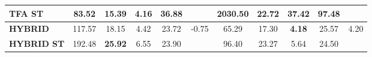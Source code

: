 \documentclass[ecp,tc, english]{iiufrgs}
\begin{document}
\begin{table}[!htbp]
{\begin{tabular}{lcccccccccc}
\textbf{TFA ST}                   & 83.52            & 15.39          & 4.16           & 36.88          &                                  & \textbf{2030.50} & 22.72          & \textbf{37.42} & \textbf{97.48} &                                  \\ \hline
\textbf{HYBRID}                   & 117.57           & 18.15          & 4.42           & 23.72          & \multirow{2}{*}{-0.75}           & 65.29            & 17.30          & \textbf{4.18}  & 25.57          & \multirow{2}{*}{4.20}            \\ \cline{1-5} \cline{7-10}
\textbf{HYBRID ST}                & 192.48           & \textbf{25.92} & 6.55           & 23.90          &                                  & 96.40            & 23.27          & 5.64           & 24.50          &                                  \\ \hline
\end{tabular}%
}
\end{table}
\end{document}
